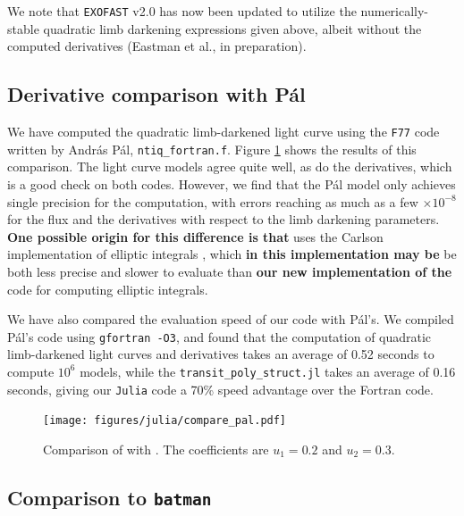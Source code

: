 \documentclass[modern,trackchanges]{aastex63}
\begin{document}
We note that \texttt{EXOFAST} v2.0 has now been updated to utilize the numerically-stable 
quadratic limb darkening expressions given above, albeit without the computed 
derivatives (Eastman et al., in preparation).

\subsection{Derivative comparison with P\'al}

We have computed the quadratic limb-darkened light curve using the \texttt{F77}
code written by Andr\'as P\'al, \texttt{ntiq\_fortran.f}.
Figure \ref{fig:Pal_comparison} shows the results of this comparison.
The light curve models agree quite well, as do the derivatives, which is
a good check on both codes.  However, we find that the P\'al model only
achieves single precision for the computation, with errors reaching as
much as a few $\times 10^{-8}$ for the flux and the derivatives with
respect to the limb darkening parameters.  {\bf One possible origin
for this difference is that} \citet{Pal2008} uses the
Carlson implementation of elliptic integrals \citep{Carlson1979},
which {\bf in this implementation may be} be both less precise and slower to
evaluate than {\bf our new implementation of the}  \citet{Bulirsch1965a} code 
for computing elliptic integrals.

We have also compared the evaluation speed of our code with P\'al's.
We compiled P\'al's code using \texttt{gfortran -O3}, and found that
the computation of quadratic limb-darkened light curves and
derivatives takes an average of 0.52 seconds to compute $10^6$ models,
while the \texttt{transit\_poly\_struct.jl} takes an average of 0.16 seconds,
giving our \texttt{Julia} code a 70\% speed advantage over the Fortran code.

\begin{figure}[p!]
    \begin{centering}
    \texttt{[image: figures/julia/compare\_pal.pdf]}
    \caption{Comparison of \citet{Pal2008} with \thiswork.  The
    coefficients are $u_1=0.2$ and $u_2=0.3$. 
    \label{fig:Pal_comparison}}
    \end{centering}
\end{figure}

\subsection{Comparison to \texttt{batman}}
\end{document}
